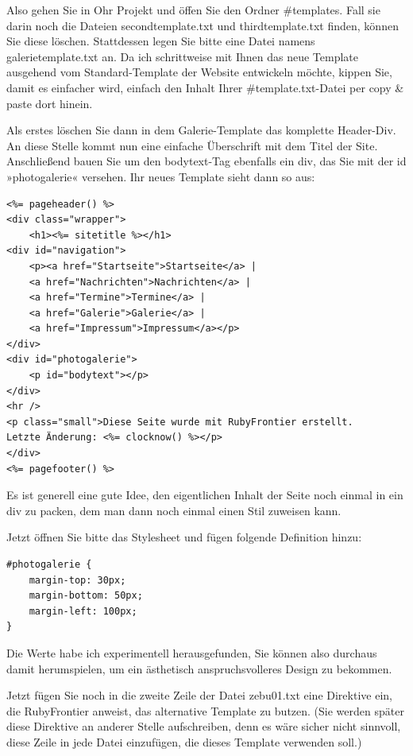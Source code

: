 \documentclass[11pt]{report}
\begin{document}
Also gehen Sie in Ohr Projekt und öffen Sie den
Ordner \#templates. Fall sie darin noch die Dateien secondtemplate.txt
und thirdtemplate.txt finden, können Sie diese löschen. Stattdessen
legen Sie bitte eine Datei namens galerietemplate.txt an. Da ich
schrittweise mit Ihnen das neue Template ausgehend vom
Standard-Template der Website entwickeln möchte, kippen Sie, damit es
einfacher wird, einfach den Inhalt Ihrer \#template.txt-Datei per copy
\& paste dort hinein.


Als erstes löschen Sie dann in dem Galerie-Template das komplette
Header-Div. An diese Stelle kommt nun eine einfache Überschrift mit
dem Titel der Site. Anschließend bauen Sie um den bodytext-Tag
ebenfalls ein div, das Sie mit der id »photogalerie« versehen. Ihr
neues Template sieht dann so aus:


\begin{verbatim}
<%= pageheader() %>
<div class="wrapper">
    <h1><%= sitetitle %></h1>
<div id="navigation">
    <p><a href="Startseite">Startseite</a> |
    <a href="Nachrichten">Nachrichten</a> |
    <a href="Termine">Termine</a> | 
    <a href="Galerie">Galerie</a> | 
    <a href="Impressum">Impressum</a></p>
</div>
<div id="photogalerie">
    <p id="bodytext"></p>
</div>
<hr />
<p class="small">Diese Seite wurde mit RubyFrontier erstellt. 
Letzte Änderung: <%= clocknow() %></p>
</div>
<%= pagefooter() %>
\end{verbatim}

Es ist generell eine gute Idee, den eigentlichen Inhalt der Seite noch
einmal in ein div zu packen, dem man dann noch einmal einen Stil
zuweisen kann.


Jetzt öffnen Sie bitte das Stylesheet und fügen folgende Definition
hinzu:


\begin{verbatim}
#photogalerie {
    margin-top: 30px;
    margin-bottom: 50px;
    margin-left: 100px;
}
\end{verbatim}

Die Werte habe ich experimentell herausgefunden, Sie können also
durchaus damit herumspielen, um ein ästhetisch anspruchsvolleres
Design zu bekommen.


Jetzt fügen Sie noch in die zweite Zeile der Datei zebu01.txt eine
Direktive ein, die RubyFrontier anweist, das alternative Template zu
butzen. (Sie werden später diese Direktive an anderer Stelle
aufschreiben, denn es wäre sicher nicht sinnvoll, diese Zeile in jede
Datei einzufügen, die dieses Template verwenden soll.)
\end{document}
